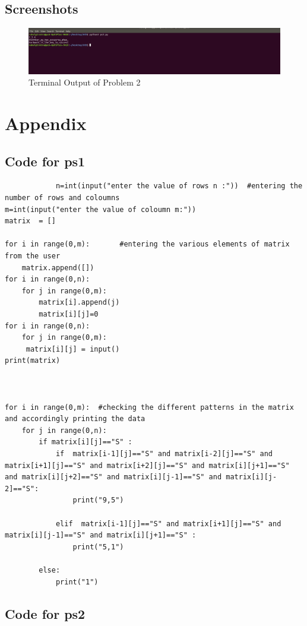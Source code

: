 \documentclass[12pt]{article}
\begin{document}
		\subsection{Screenshots}
		
			\begin{figure}[h!]
				\centering
				\caption{Terminal Output of Problem 2}
				\includegraphics[scale=.5]{ps2s2.png}
			\end{figure}
		
	\section{Appendix}
	
	
		\subsection{Code for ps1}
		
			\begin{verbatim}
			n=int(input("enter the value of rows n :"))  #entering the number of rows and coloumns
m=int(input("enter the value of coloumn m:"))
matrix  = []

for i in range(0,m):       #entering the various elements of matrix from the user
	matrix.append([])
for i in range(0,n):
	for j in range(0,m):
		matrix[i].append(j)
		matrix[i][j]=0
for i in range(0,n):
	for j in range(0,m):
	 matrix[i][j] = input()
print(matrix)



for i in range(0,m):  #checking the different patterns in the matrix and accordingly printing the data
	for j in range(0,n):
		if matrix[i][j]=="S" :
			if  matrix[i-1][j]=="S" and matrix[i-2][j]=="S" and matrix[i+1][j]=="S" and matrix[i+2][j]=="S" and matrix[i][j+1]=="S" and matrix[i][j+2]=="S" and matrix[i][j-1]=="S" and matrix[i][j-2]=="S":
				print("9,5")
		
			elif  matrix[i-1][j]=="S" and matrix[i+1][j]=="S" and matrix[i][j-1]=="S" and matrix[i][j+1]=="S" :
				print("5,1")
		
		else:
			print("1")

			\end{verbatim}
		
		\subsection{Code for ps2}
		
\end{document}
